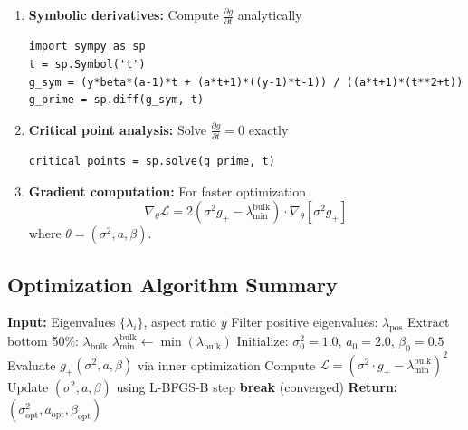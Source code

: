 \documentclass[12pt,a4paper]{article}
\begin{document}
\begin{enumerate}
    \item \textbf{Symbolic derivatives:} Compute $\frac{\partial g}{\partial t}$ analytically
    \begin{verbatim}
import sympy as sp
t = sp.Symbol('t')
g_sym = (y*beta*(a-1)*t + (a*t+1)*((y-1)*t-1)) / ((a*t+1)*(t**2+t))
g_prime = sp.diff(g_sym, t)
    \end{verbatim}

    \item \textbf{Critical point analysis:} Solve $\frac{\partial g}{\partial t} = 0$ exactly
    \begin{verbatim}
critical_points = sp.solve(g_prime, t)
    \end{verbatim}

    \item \textbf{Gradient computation:} For faster optimization
    \begin{equation}
    \nabla_{\theta} \mathcal{L} = 2(\sigma^2 g_+ - \lambda_{\min}^{\text{bulk}}) \cdot \nabla_{\theta}[\sigma^2 g_+]
    \end{equation}
    where $\theta = (\sigma^2, a, \beta)$.
\end{enumerate}

\subsection{Optimization Algorithm Summary}

\begin{algorithm}
\caption{Generalized Parameter Optimization}
\begin{algorithmic}[1]
\State \textbf{Input:} Eigenvalues $\{\lambda_i\}$, aspect ratio $y$
\State Filter positive eigenvalues: $\lambda_{\text{pos}}$
\State Extract bottom 50\%: $\lambda_{\text{bulk}}$
\State $\lambda_{\min}^{\text{bulk}} \gets \min(\lambda_{\text{bulk}})$
\State Initialize: $\sigma^2_0 = 1.0$, $a_0 = 2.0$, $\beta_0 = 0.5$
    \State Evaluate $g_+(\sigma^2, a, \beta)$ via inner optimization
    \State Compute $\mathcal{L} = (\sigma^2 \cdot g_+ - \lambda_{\min}^{\text{bulk}})^2$
    \State Update $(\sigma^2, a, \beta)$ using L-BFGS-B step
        \State \textbf{break} (converged)
    \EndIf
\EndFor
\State \textbf{Return:} $(\sigma^2_{\text{opt}}, a_{\text{opt}}, \beta_{\text{opt}})$
\end{algorithmic}
\end{algorithm}
\end{document}
